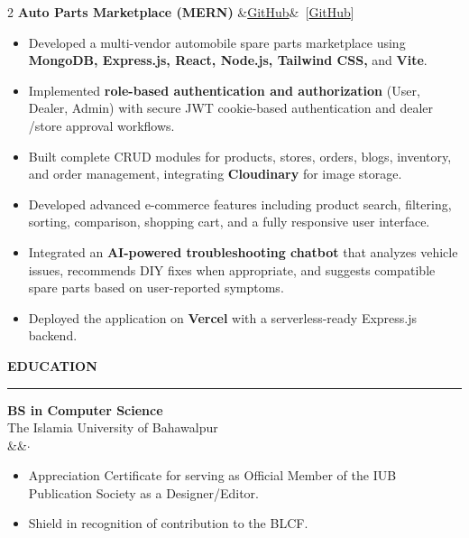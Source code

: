\documentclass[12pt,a4paper]{article}
\newcommand{\rightsection}[1]{%
  \vspace{6pt}%
  {\color{accentcyan}\Large\bfseries #1}\\[-2pt]%
  {\color{sectionline}\rule{\linewidth}{1pt}}%
  \vspace{3pt}%
}
\newcommand{\projheading}[2]{%
  \vspace{5pt}%
  {\bfseries\color{darktext} #1}%
  \ifx&#2&\else~{\small\color{accentcyan}[#2]}\fi%
  \vspace{1pt}%
}
\newenvironment{cvitems}{%
  \begin{itemize}[leftmargin=1em, itemsep=0pt, parsep=0pt, topsep=2pt, label={\color{accentcyan}\tiny$\bullet$}]%
  \small\color{bodytext}%
}{%
  \end{itemize}%
}
\newcommand{\eduheading}[4]{%
  \vspace{4pt}%
  {\small\bfseries\color{darktext} #1}\\%
  {\small\color{accentcyan} #2}\\%
  {\small\color{medgrey} #4 \ifx&#3&\else$\cdot$ #3\fi}%
  \vspace{2pt}%
}
\begin{document}
\begin{paracol}{2}
\projheading{Auto Parts Marketplace (MERN)}{\href{https://github.com/fahadguldev/auto-hub}{GitHub}}
\begin{cvitems}
  \item Developed a multi-vendor automobile spare parts marketplace using \textbf{MongoDB, Express.js, React, Node.js, Tailwind CSS,} and \textbf{Vite}.
  \item Implemented \textbf{role-based authentication and authorization} (User, Dealer, Admin) with secure JWT cookie-based authentication and dealer
  /store approval workflows.
  \item Built complete CRUD modules for products, stores, orders, blogs, inventory, and order management, integrating \textbf{Cloudinary} for image storage.
  \item Developed advanced e-commerce features including product search, filtering, sorting, comparison, shopping cart, and a fully responsive user interface.
  \item Integrated an \textbf{AI-powered troubleshooting chatbot} that analyzes vehicle issues, recommends DIY fixes when appropriate, and suggests compatible spare parts based on user-reported symptoms.
  \item Deployed the application on \textbf{Vercel} with a serverless-ready Express.js backend.
\end{cvitems}

\switchcolumn

\rightsection{EDUCATION}

\eduheading{BS in Computer Science}{The Islamia University of Bahawalpur}{}{}
\begin{cvitems}
  \item Appreciation Certificate for serving as Official Member of the IUB Publication Society as a Designer/Editor.
  \item Shield in recognition of contribution to the BLCF.
\end{cvitems}



\end{paracol}
\end{document}
